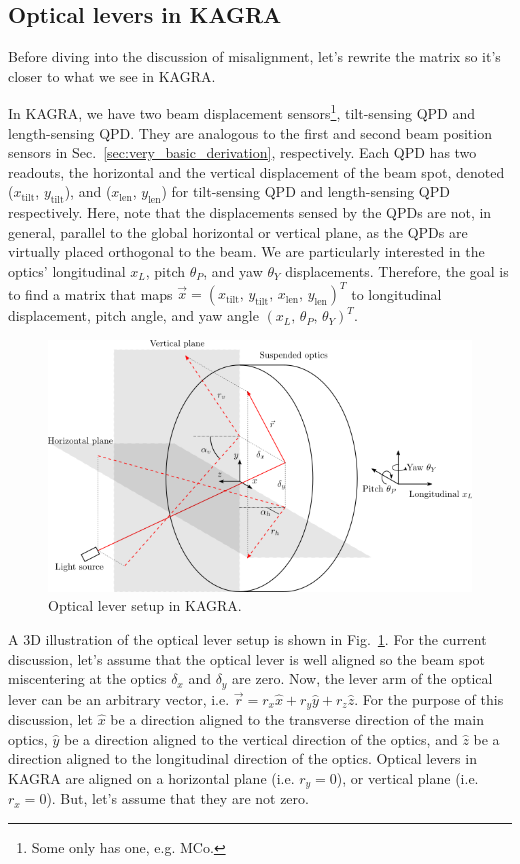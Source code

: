 \subsection{Optical levers in KAGRA}
Before diving into the discussion of misalignment, let's rewrite the matrix so it's closer to what we see in KAGRA.

In KAGRA, we have two beam displacement sensors\footnote{Some only has one, e.g. MCo.}, tilt-sensing QPD and length-sensing QPD. They are analogous to the first and second beam position sensors in Sec.~\ref{sec:very_basic_derivation}, respectively.
Each QPD has two readouts, the horizontal and the vertical displacement of the beam spot, denoted ($x_\mathrm{tilt}$, $y_\mathrm{tilt}$), and ($x_\mathrm{len}$, $y_\mathrm{len}$) for tilt-sensing QPD and length-sensing QPD respectively.
Here, note that the displacements sensed by the QPDs are not, in general, parallel to the global horizontal or vertical plane, as the QPDs are virtually placed orthogonal to the beam.
We are particularly interested in the optics' longitudinal $x_L$, pitch $\theta_P$, and yaw $\theta_Y$ displacements.
Therefore, the goal is to find a matrix that maps $\vec{x}=\left(x_\mathrm{tilt},\, y_\mathrm{tilt},\, x_\mathrm{len},\, y_\mathrm{len}\right)^T$ to longitudinal displacement, pitch angle, and yaw angle $\left(x_L,\, \theta_P,\, \theta_Y\right)^T$.

\begin{figure}[!h]
	\centering
	\includegraphics[width=0.7\linewidth]{figures/kagra_optical_lever_3d}
	\caption{Optical lever setup in KAGRA.}
	\label{fig:kagraopticallever3d}
\end{figure}

A 3D illustration of the optical lever setup is shown in Fig.~\ref{fig:kagraopticallever3d}.
For the current discussion, let's assume that the optical lever is well aligned so the beam spot miscentering at the optics $\delta_x$ and $\delta_y$ are zero.
Now, the lever arm of the optical lever can be an arbitrary vector, i.e. $\vec{r}=r_x\hat{x}+r_y\hat{y}+r_z\hat{z}$.
For the purpose of this discussion, let $\hat{x}$ be a direction aligned to the transverse direction of the main optics, $\hat{y}$ be a direction aligned to the vertical direction of the optics, and $\hat{z}$ be a direction aligned to the longitudinal direction of the optics.
Optical levers in KAGRA are aligned on a horizontal plane (i.e. $r_y=0$), or vertical plane (i.e. $r_x=0$).
But, let's assume that they are not zero.

